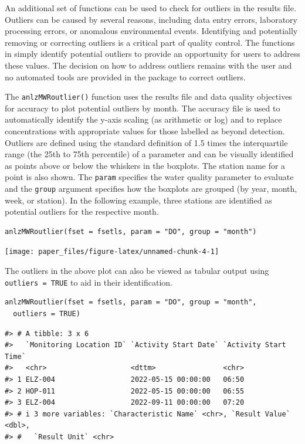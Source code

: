 An additional set of functions can be used to check for outliers in the results file. Outliers can be caused by several reasons, including data entry errors, laboratory processing errors, or anomalous environmental events. Identifying and potentially removing or correcting outliers is a critical part of quality control. The functions in  simply identify potential outliers to provide an opportunity for users to address these values. The decision on how to address outliers remains with the user and no automated tools are provided in the package to correct outliers.

The \texttt{anlzMWRoutlier()} function uses the results file and data quality objectives for accuracy to plot potential outliers by month. The accuracy file is used to automatically identify the y-axis scaling (as arithmetic or log) and to replace concentrations with appropriate values for those labelled as beyond detection. Outliers are defined using the standard definition of 1.5 times the interquartile range (the 25th to 75th percentile) of a parameter and can be visually identified as points above or below the whiskers in the boxplots. The station name for a point is also shown. The \texttt{param} specifies the water quality parameter to evaluate and the \texttt{group} argument specifies how the boxplots are grouped (by year, month, week, or station). In the following example, three stations are identified as potential outliers for the respective month.

\begin{verbatim}
anlzMWRoutlier(fset = fsetls, param = "DO", group = "month")
\end{verbatim}

\texttt{[image: paper\_files/figure-latex/unnamed-chunk-4-1]}

The outliers in the above plot can also be viewed as tabular output using \texttt{outliers\ =\ TRUE} to aid in their identification.

\begin{verbatim}
anlzMWRoutlier(fset = fsetls, param = "DO", group = "month", 
  outliers = TRUE)
\end{verbatim}

\begin{verbatim}
#> # A tibble: 3 x 6
#>   `Monitoring Location ID` `Activity Start Date` `Activity Start Time`
#>   <chr>                    <dttm>                <chr>                
#> 1 ELZ-004                  2022-05-15 00:00:00   06:50                
#> 2 HOP-011                  2022-05-15 00:00:00   06:55                
#> 3 ELZ-004                  2022-09-11 00:00:00   07:20                
#> # i 3 more variables: `Characteristic Name` <chr>, `Result Value` <dbl>,
#> #   `Result Unit` <chr>
\end{verbatim}


